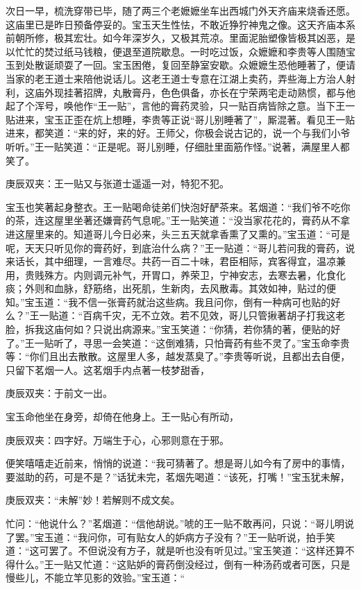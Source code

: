 \begin{parag}
    次日一早，梳洗穿带已毕，随了两三个老嬷嬷坐车出西城门外天齐庙来烧香还愿。这庙里已是昨日预备停妥的。宝玉天生性怯，不敢近狰狞神鬼之像。这天齐庙本系前朝所修，极其宏壮。如今年深岁久，又极其荒凉。里面泥胎塑像皆极其凶恶，是以忙忙的焚过纸马钱粮，便退至道院歇息。一时吃过饭，众嬷嬷和李贵等人围随宝玉到处散诞顽耍了一回。宝玉困倦，复回至静室安歇。众嬷嬷生恐他睡著了，便请当家的老王道士来陪他说话儿。这老王道士专意在江湖上卖药，弄些海上方治人射利，这庙外现挂著招牌，丸散膏丹，色色俱备，亦长在宁荣两宅走动熟惯，都与他起了个浑号，唤他作“王一贴”，言他的膏药灵验，只一贴百病皆除之意。当下王一贴进来，宝玉正歪在炕上想睡，李贵等正说“哥儿别睡著了”，厮混著。看见王一贴进来，都笑道：“来的好，来的好。王师父，你极会说古记的，说一个与我们小爷听听。”王一贴笑道：“正是呢。哥儿别睡，仔细肚里面筋作怪。”说著，满屋里人都笑了。\begin{note}庚辰双夹：王一贴又与张道士遥遥一对，特犯不犯。\end{note}宝玉也笑著起身整衣。王一贴喝命徒弟们快泡好酽茶来。茗烟道：“我们爷不吃你的茶，连这屋里坐著还嫌膏药气息呢。”王一贴笑道：“没当家花花的，膏药从不拿进这屋里来的。知道哥儿今日必来，头三五天就拿香熏了又熏的。”宝玉道：“可是呢，天天只听见你的膏药好，到底治什么病？”王一贴道：“哥儿若问我的膏药，说来话长，其中细理，一言难尽。共药一百二十味，君臣相际，宾客得宜，温凉兼用，贵贱殊方。内则调元补气，开胃口，养荣卫，宁神安志，去寒去暑，化食化痰；外则和血脉，舒筋络，出死肌，生新肉，去风散毒。其效如神，贴过的便知。”宝玉道：“我不信一张膏药就治这些病。我且问你，倒有一种病可也贴的好么？”王一贴道：“百病千灾，无不立效。若不见效，哥儿只管揪著胡子打我这老脸，拆我这庙何如？只说出病源来。”宝玉笑道：“你猜，若你猜的著，便贴的好了。”王一贴听了，寻思一会笑道：“这倒难猜，只怕膏药有些不灵了。”宝玉命李贵等：“你们且出去散散。这屋里人多，越发蒸臭了。”李贵等听说，且都出去自便，只留下茗烟一人。这茗烟手内点著一枝梦甜香，\begin{note}庚辰双夹：于前文一出。\end{note}宝玉命他坐在身旁，却倚在他身上。王一贴心有所动，\begin{note}庚辰双夹：四字好。万端生于心，心邪则意在于邪。\end{note}便笑嘻嘻走近前来，悄悄的说道：“我可猜著了。想是哥儿如今有了房中的事情，要滋助的药，可是不是？”话犹未完，茗烟先喝道：“该死，打嘴！”宝玉犹未解，\begin{note}庚辰双夹：“未解”妙！若解则不成文矣。\end{note}忙问：“他说什么？”茗烟道：“信他胡说。”唬的王一贴不敢再问，只说：“哥儿明说了罢。”宝玉道：“我问你，可有贴女人的妒病方子没有？”王一贴听说，拍手笑道：“这可罢了。不但说没有方子，就是听也没有听见过。”宝玉笑道：“这样还算不得什么。”王一贴又忙道：“这贴妒的膏药倒没经过，倒有一种汤药或者可医，只是慢些儿，不能立竿见影的效验。”宝玉道：“
\end{parag}
